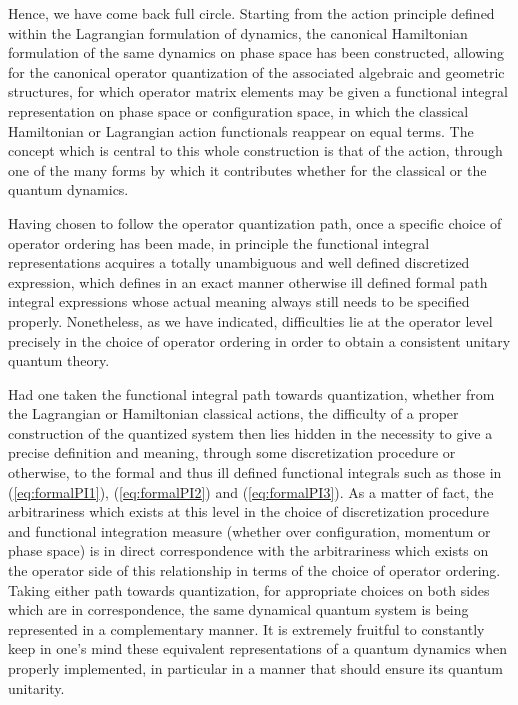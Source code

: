 \documentclass[a4paper,11pt]{article}
\begin{document}
Hence, we have come back full circle. Starting from the action principle
defined within the Lagrangian formulation of dynamics, the canonical
Hamiltonian formulation of the same dynamics on phase space has been
constructed, allowing for the canonical operator quantization of the
associated algebraic and geometric structures, for which operator
matrix elements may be given a functional integral representation
on phase space or configuration space, in which the classical Hamiltonian
or Lagrangian action functionals reappear on equal terms. The concept
which is central to this whole construction is that of the action,
through one of the many forms by which it contributes whether for the
classical or the quantum dynamics.

Having chosen to follow the operator quantization path, once a specific
choice of operator ordering has been made, in principle the functional
integral representations acquires a totally unambiguous and well defined
discretized expression, which defines in an exact manner otherwise
ill defined formal path integral expressions whose actual meaning always
still needs to be specified properly. Nonetheless, as we have indicated, 
difficulties lie at the operator level precisely in the choice of operator 
ordering in order to obtain a consistent unitary quantum theory.

Had one taken the functional integral path towards quantization,
whether from the Lagrangian or Hamiltonian classical actions,
the difficulty of a proper construction of the quantized system
then lies hidden in the necessity to give a precise definition and
meaning, through some discretization procedure or otherwise, to the
formal and thus ill defined functional integrals such as those in 
(\ref{eq:formalPI1}), (\ref{eq:formalPI2}) and (\ref{eq:formalPI3}). 
As a matter of fact, the arbitrariness which exists at this level in the 
choice of discretization procedure and functional integration measure
(whether over configuration, momentum or phase space) is in direct
correspondence with the arbitrariness which exists on the operator
side of this relationship in terms of the choice of operator ordering.
Taking either path towards quantization, for appropriate choices on
both sides which are in correspondence, the same dynamical quantum system 
is being represented in a complementary manner. It is extremely
fruitful to constantly keep in one's mind these equivalent
representations of a quantum dynamics when properly implemented, in particular
in a manner that should ensure its quantum unitarity.
\end{document}
